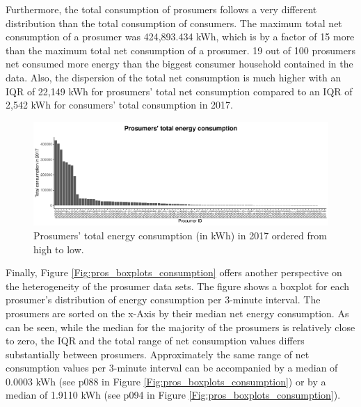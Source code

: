 Furthermore, the total consumption of prosumers follows a very different distribution than the total consumption of consumers. The maximum total net consumption of a prosumer was 424,893.434 kWh, which is by a factor of 15 more than the maximum total net consumption of a prosumer. 19 out of 100 prosumers net consumed more energy than the biggest consumer household contained in the data. Also, the dispersion of the total net consumption is much higher with an IQR of 22,149 kWh for prosumers' total net consumption compared to an IQR of 2,542 kWh for consumers' total consumption in 2017.

\begin{figure}[htbp]
 \centering
\includegraphics[width=\textwidth]{thesis/graphs/prosumer_totalconsumption2.pdf}
\caption[Prosumers’ total energy consumption (in kWh) in 2017 ordered from high to low]{Prosumers’ total energy consumption (in kWh) in 2017 ordered from high to low. \quantnet}
\label{Fig:pros_total_consumption}
\end{figure}

Finally, Figure \ref{Fig:pros_boxplots_consumption} offers another perspective on the heterogeneity of the prosumer data sets. The figure shows a boxplot for each prosumer's distribution of energy consumption per 3-minute interval. The prosumers are sorted on the x-Axis by their median net energy consumption. As can be seen, while the median for the majority of the prosumers is relatively close to zero, the IQR and the total range of net consumption values differs substantially between prosumers. Approximately the same range of net consumption values per 3-minute interval can be accompanied by a median of 0.0003 kWh (see p088 in Figure \ref{Fig:pros_boxplots_consumption}) or by a median of 1.9110 kWh (see p094 in Figure \ref{Fig:pros_boxplots_consumption}).


